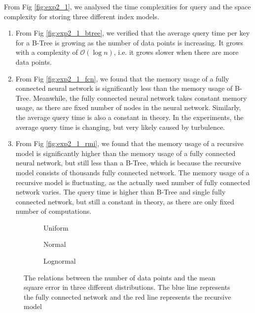 \begin{mscconclusion}
	From Fig \ref{fig:exp2_1}, we analysed the time complexities for query and the space complexity for storing three different index models.
	
	\begin{enumerate}
	\item From Fig \ref{fig:exp2_1_btree}, we verified that the average query time per key for a B-Tree is growing as the number of data points is increasing. It grows with a complexity of $\mathcal{O}(\log n)$, i.e. it grows slower when there are more data points. 
	\item From Fig \ref{fig:exp2_1_fcn}, we found that the memory usage of a fully connected neural network is significantly less than the memory usage of B-Tree. Meanwhile, the fully connected neural network takes constant memory usage, as there are fixed number of nodes in the neural network. Similarly, the average query time is also a constant in theory. In the experiments, the average query time is changing, but very likely caused by turbulence.
	\item From Fig \ref{fig:exp2_1_rmi}, we found that the memory usage of a recursive model is significantly higher than the memory usage of a fully connected neural network, but still less than a B-Tree, which is because the recursive model consists of thousands fully connected network. The memory usage of a recursive model is fluctuating, as the actually used number of fully connected network varies. The query time  is higher than B-Tree and single fully connected network, but still a constant in theory, as there are only fixed number of computations.
	\end{enumerate}
\end{mscconclusion}

\begin{figure}
 \centering
     \begin{subfigure}[b]{0.3\textwidth}
         \centering
         
         \caption{Uniform}
         \label{fig:exp2_2_uniform}
     \end{subfigure}
     \hfill
     \begin{subfigure}[b]{0.3\textwidth}
         \centering
         
         \caption{Normal}
         \label{fig:exp2_2_normal}
     \end{subfigure}
     \hfill
     \begin{subfigure}[b]{0.3\textwidth}
         \centering
         
         \caption{Lognormal}
         \label{fig:exp2_2_lognormal}
     \end{subfigure}
        \caption{The relations between the number of data points and the mean square error in three different distributions. The blue line represents the fully connected network and the red line represents the recursive model}
        \label{fig:exp2_2}
\end{figure}

